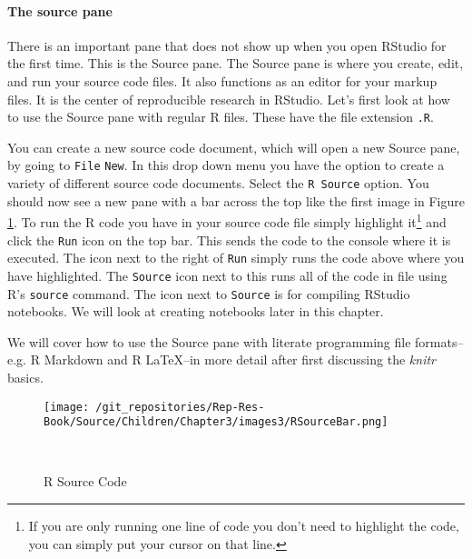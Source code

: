 \documentclass[ChapterTOCs,krantz1]{krantz}\usepackage{graphicx, color}
\begin{document}
{\paragraph{The source pane}

There is an important pane that does not show up when you open RStudio for the first time. This is the Source pane. The Source pane is where you create, edit, and run your source code files. It also functions as an editor for your markup files. It is the center of reproducible research in RStudio. Let's first look at how to use the Source pane with regular R files. These have the file extension \texttt{.R}.

You can create a new source code document, which will open a new Source pane, by going to \texttt{File} \textrightarrow \: \texttt{New}. In this drop down menu you have the option to create a variety of different source code documents. Select the \texttt{R Source} option. You should now see a new pane with a bar across the top like the first image in Figure \ref{SourcePanes}. To run the R code you have in your source code file simply highlight it\footnote{If you are only running one line of code you don't need to highlight the code, you can simply put your cursor on that line.} and click the \texttt{Run} icon on the top bar. This sends the code to the console where it is executed. The icon next to the right of \texttt{Run} simply runs the code above where you have highlighted. The \texttt{Source} icon next to this runs all of the code in file using R's \texttt{source} command. The icon next to \texttt{Source} is for compiling RStudio notebooks. We will look at creating notebooks later in this chapter.

We will cover how to use the Source pane with literate programming file formats--e.g. R Markdown and R \LaTeX--in more detail after first discussing the {\emph{knitr}} basics. 

\begin{figure}[ht]
    \caption{RStudio Source Code Pane Top Bars}
    \label{SourcePanes}
    \begin{center}
    
        \begin{subfigure}
            \caption{R Source Code}
            \texttt{[image: /git\_repositories/Rep-Res-Book/Source/Children/Chapter3/images3/RSourceBar.png]}
        \end{subfigure}\\[0.5cm]
        

\end{center}
\end{figure}}
\end{document}
